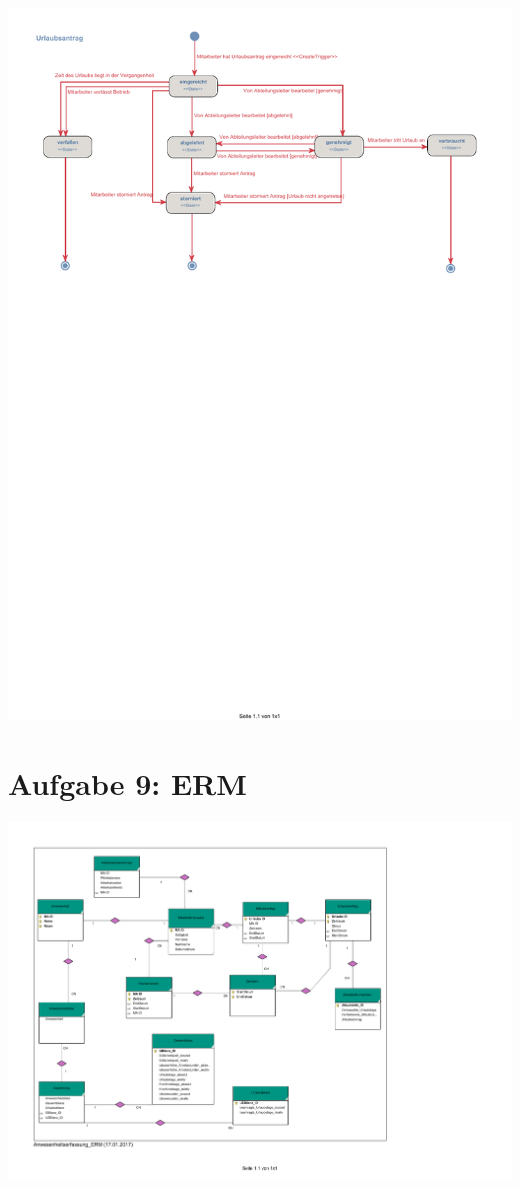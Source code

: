 \begin{center}
\includegraphics[width=0.95\linewidth]{Aktivitaet_Urlaubsantrag}
\end{center}

\chapter*{Aufgabe 9: ERM}
\setcounter{section}{0}
\addtocounter{chapter}{1}
\begin{center}
\includegraphics[width=0.95\linewidth]{Anwesenheitserfassung_ERM}
\end{center}

